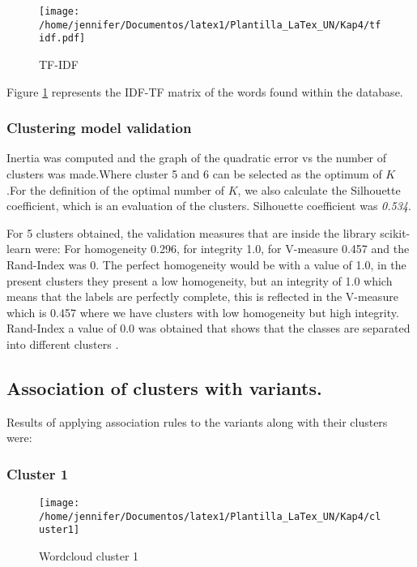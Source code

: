 \documentclass[twocolumn]{bmcart}%
\begin{document}
\begin{figure}[h!] 
	\centering
	\texttt{[image: /home/jennifer/Documentos/latex1/Plantilla\_LaTex\_UN/Kap4/tfidf.pdf]}
	\caption{TF-IDF} 
	\label{fig:IDFTF}
\end{figure}

Figure \ref{fig:IDFTF} represents the IDF-TF matrix of the words found within the database.

\subsubsection*{Clustering model validation}

Inertia was computed and  the graph of the quadratic error vs the number of clusters was made.Where cluster 5 and 6 can be selected as the optimum of $K$ .For the definition of the optimal number of $K$, we also calculate the Silhouette coefficient, which is an evaluation of the clusters. Silhouette coefficient was \textit{0.534}. 

For 5 clusters obtained, the validation measures that are inside the library scikit-learn were: For homogeneity 0.296, for integrity 1.0, for V-measure 0.457 and the Rand-Index was 0. The perfect homogeneity would be with a value of 1.0, in the present clusters they present a low homogeneity, but an integrity of 1.0 which means that the labels are perfectly complete, this is reflected in the V-measure which is 0.457 where we have clusters with low homogeneity but high integrity. Rand-Index a value of 0.0 was obtained that shows that the classes are separated into different clusters \cite{scikit-learn}.

\subsection*{Association of clusters with variants.}

Results of applying association rules to the variants along with their clusters were:

\subsubsection*{Cluster 1}

\begin{figure}[h!] 
	\centering
	\texttt{[image: /home/jennifer/Documentos/latex1/Plantilla\_LaTex\_UN/Kap4/cluster1]}
	\caption{Wordcloud cluster 1} 
	\label{f:nube1}
\end{figure}
\end{document}
